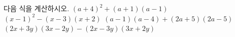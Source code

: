 다음 식을 계산하시오.
 $(a+4)^2+(a+1)(a-1)$
 $(x-1)^2-(x-3)(x+2)$
 $(a-1)(a-4)+(2a+5)(2a-5)$
 $(2x+3y)(3x-2y)-(2x-3y)(3x+2y)$

